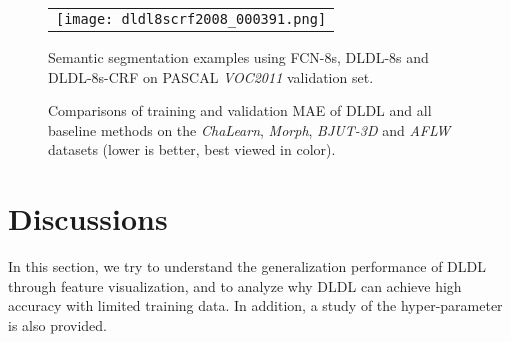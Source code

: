 \documentclass[journal]{IEEEtran}
\begin{document}
\begin{figure}
{\begin{tabular}{@{\,}c@{\,}}
    \texttt{[image: dldl8scrf2008\_000391.png]}
    \end{tabular}
    }
    \hspace{-12pt}
	\caption{Semantic segmentation examples using FCN-8s, DLDL-8s and DLDL-8s-CRF on PASCAL \emph{VOC2011} validation set.}
	\label{fig:eg-ss}
\end{figure}

\begin{figure*}
    \centering
	\caption{ Comparisons of training and validation MAE of DLDL and all baseline methods on the \emph{ChaLearn}, \emph{Morph}, \emph{BJUT-3D} and \emph{AFLW} datasets (lower is better, best viewed in color).} \label{fig:mae-epoch}
\end{figure*}

\section{Discussions}\label{sec:dis}
In this section, we try to understand the generalization performance of DLDL through feature visualization, and to analyze why DLDL can achieve high accuracy with limited training data. In addition, a study of the hyper-parameter is also provided.
\end{document}
